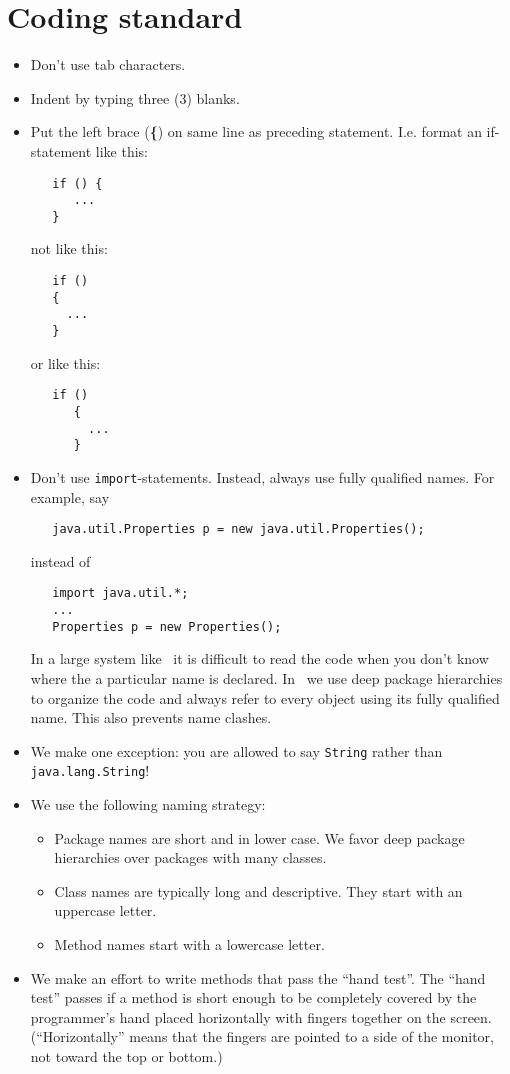 \section{Coding standard}
\begin{itemize}
    \item Don't use tab characters.
    \item Indent by typing three (3) blanks.
    \item Put the left brace ({\bf{\{}}) on
          same line as preceding statement. I.e.
          format an if-statement like this:
\begin{verbatim}
   if () {
      ...
   }
\end{verbatim}
        not like this:
\begin{verbatim}
   if ()
   {
     ...
   }
\end{verbatim}
        or like this:
\begin{verbatim}
   if ()
      {
        ...
      }
\end{verbatim}
     \item Don't use {\tt import}-statements. 
           Instead, always use fully qualified names.
           For example, say 
\begin{verbatim}
   java.util.Properties p = new java.util.Properties();
\end{verbatim}
           instead of
\begin{verbatim}
   import java.util.*;
   ...
   Properties p = new Properties();
\end{verbatim}
          In a large system like \SM\ it is difficult to
          read the code when you don't know where the
          a particular name is declared. In \SM\ we use
          deep package hierarchies to organize the code
          and always refer to every object using its 
          fully qualified name. This also prevents name
          clashes.
   \item We make one exception: you are allowed to say
         {\tt String} rather than {\tt java.lang.String}!
   \item We use the following naming strategy:
         \begin{itemize}
            \item Package names are short and in lower case.
                  We favor deep package hierarchies over
                  packages with many classes.
            \item Class names are typically long and descriptive.
                  They start with an uppercase letter.
            \item Method names start with a lowercase letter.
         \end{itemize}
   \item We make an effort to write methods that pass the ``hand test''.
	 The ``hand test'' passes if a method is short enough
	 to be completely covered by the programmer's hand placed horizontally
	 with fingers together on the screen.  (``Horizontally'' means that the
	 fingers are pointed to a side of the monitor, not toward the top or bottom.)
\end{itemize}

